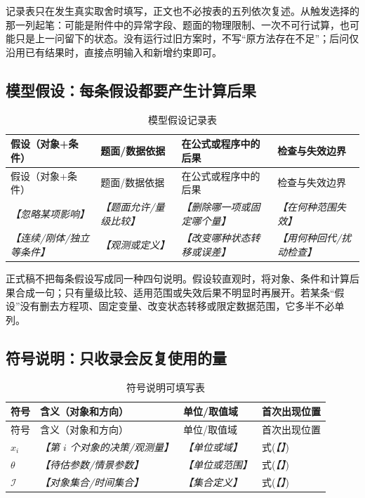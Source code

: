 \documentclass[UTF8,zihao=-4]{ctexart}
\newcommand{\slot}[1]{\textcolor{inkblue}{\textit{【#1】}}}
\begin{document}
记录表只在发生真实取舍时填写，正文也不必按表的五列依次复述。从触发选择的那一列起笔：可能是附件中的异常字段、题面的物理限制、一次不可行试算，也可能只是上一问留下的状态。没有运行过旧方案时，不写“原方法存在不足”；后问仅沿用已有结果时，直接点明输入和新增约束即可。

\subsection{模型假设：每条假设都要产生计算后果}

\begin{longtable}{p{3.2cm}p{3.1cm}p{4.0cm}p{3.6cm}}
\caption{模型假设记录表}\label{tab:template-assumption-ledger}\\
\toprule
假设（对象+条件） & 题面/数据依据 & 在公式或程序中的后果 & 检查与失效边界\\
\midrule
\endfirsthead
\toprule
假设（对象+条件） & 题面/数据依据 & 在公式或程序中的后果 & 检查与失效边界\\
\midrule
\endhead
\slot{忽略某项影响} & \slot{题面允许/量级比较} & \slot{删除哪一项或固定哪个量} & \slot{在何种范围失效}\\
\slot{连续/刚体/独立等条件} & \slot{观测或定义} & \slot{改变哪种状态转移或误差} & \slot{用何种回代/扰动检查}\\
\bottomrule
\end{longtable}

正式稿不把每条假设写成同一种四句说明。假设较直观时，将对象、条件和计算后果合成一句；只有量级比较、适用范围或失效后果不明显时再展开。若某条“假设”没有删去方程项、固定变量、改变状态转移或限定数据范围，它多半不必单列。

\subsection{符号说明：只收录会反复使用的量}

\begin{longtable}{p{2.2cm}p{7.0cm}p{2.2cm}p{3.3cm}}
\caption{符号说明可填写表}\label{tab:template-symbol-ledger}\\
\toprule
符号 & 含义（对象和方向） & 单位/取值域 & 首次出现位置\\
\midrule
\endfirsthead
\toprule
符号 & 含义（对象和方向） & 单位/取值域 & 首次出现位置\\
\midrule
\endhead
$x_i$ & \slot{第 $i$ 个对象的决策/观测量} & \slot{单位或域} & 式(\slot{})\\
$\theta$ & \slot{待估参数/情景参数} & \slot{单位或范围} & 式(\slot{})\\
$\mathcal{I}$ & \slot{对象集合/时间集合} & \slot{集合定义} & 式(\slot{})\\
\bottomrule
\end{longtable}
\end{document}

